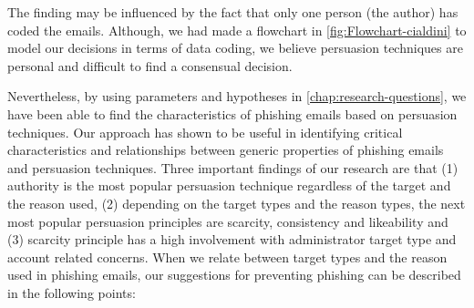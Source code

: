 The finding may be influenced by the fact that only one person (the
author) has coded the emails. Although, we had made a flowchart in
\autoref{fig:Flowchart-cialdini} to model our decisions in terms
of data coding, we believe persuasion techniques are personal and
difficult to find a consensual decision.

Nevertheless, by using parameters and hypotheses in \autoref{chap:research-questions},
we have been able to find the characteristics of phishing emails based
on persuasion techniques. Our approach has shown to be useful in identifying
critical characteristics and relationships between generic properties
of phishing emails and persuasion techniques. Three important findings
of our research are that (1) authority is the most popular persuasion
technique regardless of the target and the reason used, (2) depending
on the target types and the reason types, the next most popular persuasion
principles are scarcity, consistency and likeability and (3) scarcity
principle has a high involvement with administrator target type and
account related concerns. When we relate between target types and
the reason used in phishing emails, our suggestions for preventing
phishing can be described in the following points:
